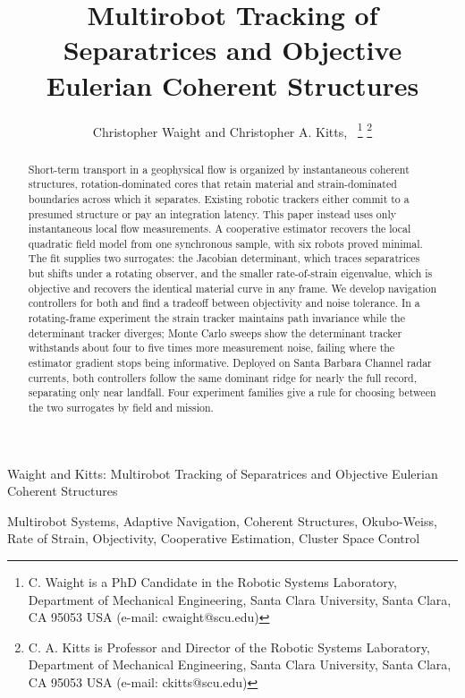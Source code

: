 \documentclass[lettersize,journal]{IEEEtran}
\begin{document}
\title{Multirobot Tracking of Separatrices and
Objective Eulerian Coherent Structures}

\author{Christopher Waight and Christopher A. Kitts,~
\thanks{C. Waight is a PhD Candidate in the Robotic Systems Laboratory, Department of Mechanical Engineering, Santa Clara University, Santa Clara, CA 95053 USA (e-mail: cwaight@scu.edu)}
\thanks{C. A. Kitts is Professor and Director of the Robotic Systems Laboratory, Department of Mechanical Engineering, Santa Clara University, Santa Clara, CA 95053 USA (e-mail: ckitts@scu.edu)}
}
%
{Waight and Kitts: Multirobot Tracking of Separatrices and Objective Eulerian Coherent Structures}

\maketitle

\begin{abstract}
Short-term transport in a geophysical flow is organized by
instantaneous coherent structures, rotation-dominated cores that
retain material and strain-dominated boundaries across which it
separates. Existing robotic trackers either commit to a presumed
structure or pay an integration latency. This paper instead uses only
instantaneous local flow measurements. A cooperative estimator recovers
the local quadratic field model from one synchronous sample, with six
robots proved minimal. The fit supplies two surrogates: the Jacobian
determinant, which traces separatrices but shifts under a rotating
observer, and the smaller rate-of-strain eigenvalue, which is objective
and recovers the identical material curve in any frame. We develop
navigation controllers for both and find a tradeoff between objectivity
and noise tolerance. In a rotating-frame experiment the strain tracker
maintains path invariance while the determinant tracker diverges; Monte
Carlo sweeps show the determinant tracker withstands about four to five
times more measurement noise, failing where the estimator gradient
stops being informative. Deployed on Santa Barbara Channel radar
currents, both controllers follow the same dominant ridge for nearly
the full record, separating only near landfall. Four experiment
families give a rule for choosing between the two surrogates by field
and mission.
\end{abstract}

\begin{IEEEkeywords}
Multirobot Systems, Adaptive Navigation, Coherent Structures,
Okubo-Weiss, Rate of Strain, Objectivity, Cooperative
Estimation, Cluster Space Control
\end{IEEEkeywords}
\end{document}
